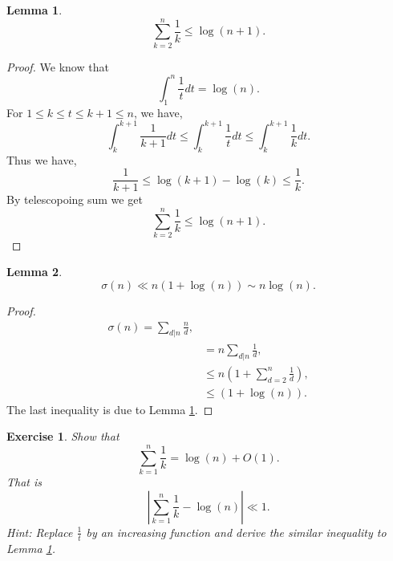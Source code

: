 \documentclass{article}
\newtheorem{lemma}{Lemma}[section]
\newtheorem{exercise}{Exercise}[section]
\begin{document}
\begin{lemma}
  \begin{equation*}
    \sum_{k=2}^n{\frac 1 k} \leq \log(n+1).
  \end{equation*}
  \label{harmonic_series_upper_bound}
\end{lemma}

\begin{proof}
  We know that 
  \begin{equation*}
    \int_1^n {\frac 1 t}dt = \log(n).
  \end{equation*}
  For $1\leq k\leq t\leq k+1\leq n$, we have,
  \begin{equation*}
    \int_k^{k+1}{\frac 1 {k+1}}dt\leq \int_k^{k+1}{\frac 1 t}dt \leq \int_k^{k+1}{\frac 1 k}dt. 
  \end{equation*}
  Thus we have,
  \begin{equation*}
    {\frac 1{k+1}}\leq\log(k+1)-\log(k)\leq {\frac 1 k}.
  \end{equation*}
  By telescopoing sum we get 
  \begin{equation*}
    \sum_{k=2}^n{\frac 1 k}\leq \log(n+1).
  \end{equation*}
\end{proof}

\begin{lemma}
  \begin{equation*}
    \sigma(n) \ll  n(1+\log(n))\sim n\log(n).
  \end{equation*}
\end{lemma}

\begin{proof}
  \begin{align*}
    \sigma(n) = \sum_{d|n}{\frac n d},\\
    & = n\sum_{d|n}{\frac 1 d},\\
    &\leq n\left(1+\sum_{d=2}^n{\frac 1 d}\right),\\
    & \leq(1+\log(n)).
  \end{align*}
  The last inequality is due to Lemma \ref{harmonic_series_upper_bound}.
\end{proof}

\begin{exercise}
  Show that 
  \begin{equation*}
    \sum_{k=1}^n{\frac 1 k} = \log(n)+O(1).
  \end{equation*}
  That is 
  \begin{equation*}
    \left\vert\sum_{k=1}^n{\frac 1 k} - \log(n)\right\vert \ll  1.
  \end{equation*}
  Hint: Replace ${\frac 1 t}$ by an increasing function and derive the similar inequality to Lemma \ref{harmonic_series_upper_bound}.
\end{exercise}
\end{document}
